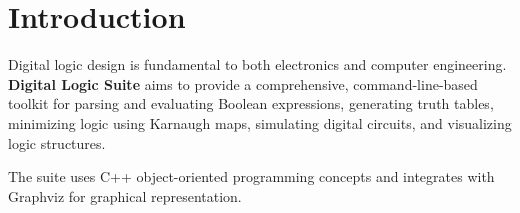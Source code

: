 \section{Introduction}

Digital logic design is fundamental to both electronics and computer engineering. \textbf{Digital Logic Suite} aims to provide a comprehensive, command-line-based toolkit for parsing and evaluating Boolean expressions, generating truth tables, minimizing logic using Karnaugh maps, simulating digital circuits, and visualizing logic structures.

\vspace{0.5em}

The suite uses C++ object-oriented programming concepts and integrates with Graphviz for graphical representation.
